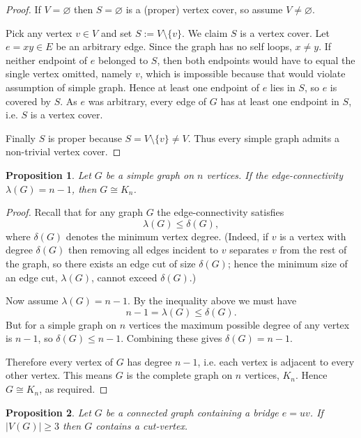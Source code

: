 \documentclass{article}
\theoremstyle{plain}
\newtheorem{proposition}{Proposition}
\theoremstyle{definition}
\theoremstyle{remark}
\begin{document}
\begin{proof}
If \(V=\varnothing\) then \(S=\varnothing\) is a (proper) vertex cover, so
assume \(V\neq\varnothing\).

Pick any vertex \(v\in V\) and set \(S := V\setminus\{v\}\). We claim \(S\) is
a vertex cover. Let \(e=xy\in E\) be an arbitrary edge. Since the graph has
no self loops, \(x\neq y\). If neither endpoint of \(e\) belonged to \(S\), then
both endpoints would have to equal the single vertex omitted, namely \(v\),
which is impossible because that would violate assumption of simple graph. Hence at least one endpoint
of \(e\) lies in \(S\), so \(e\) is covered by \(S\). As \(e\) was arbitrary,
every edge of \(G\) has at least one endpoint in \(S\), i.e. \(S\) is a vertex
cover.

Finally \(S\) is proper because \(S=V\setminus\{v\}\neq V\). Thus every simple graph admits a non-trivial vertex cover.
\end{proof}

\begin{proposition}
Let $G$ be a simple graph on $n$ vertices. If the edge-connectivity $\lambda(G)=n-1$,
then $G\cong K_n$.
\end{proposition}

\begin{proof}
Recall that for any graph $G$ the edge-connectivity satisfies
\[
\lambda(G)\le \delta(G),
\]
where $\delta(G)$ denotes the minimum vertex degree. (Indeed, if $v$ is a vertex with
degree $\delta(G)$ then removing all edges incident to $v$ separates $v$ from the
rest of the graph, so there exists an edge cut of size $\delta(G)$; hence the minimum
size of an edge cut, $\lambda(G)$, cannot exceed $\delta(G)$.)

Now assume $\lambda(G)=n-1$. By the inequality above we must have
\[
n-1 = \lambda(G) \le \delta(G).
\]
But for a simple graph on $n$ vertices the maximum possible degree of any vertex is $n-1$,
so $\delta(G)\le n-1$. Combining these gives $\delta(G)=n-1$.

Therefore every vertex of $G$ has degree $n-1$, i.e. each vertex is adjacent to every
other vertex. This means $G$ is the complete graph on $n$ vertices, $K_n$. Hence
$G\cong K_n$, as required.
\end{proof}
\begin{proposition}
Let $G$ be a connected graph containing a bridge $e=uv$. If $|V(G)|\ge 3$ then
$G$ contains a cut-vertex.
\end{proposition}
\end{document}
